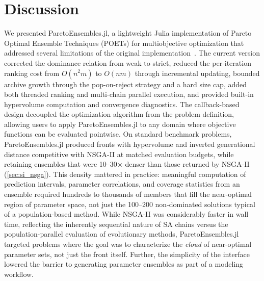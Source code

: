\documentclass[12pt]{article}
\begin{document}
\section{Discussion}\label{sec:discussion}
We presented ParetoEnsembles.jl, a lightweight Julia implementation of Pareto Optimal Ensemble Techniques (POETs) for multiobjective optimization that addressed several limitations of the original implementation~\cite{Song2010,Bassen2016}. The current version corrected the dominance relation from weak to strict, reduced the per-iteration ranking cost from $O(n^2 m)$ to $O(nm)$ through incremental updating, bounded archive growth through the pop-on-reject strategy and a hard size cap, added both threaded ranking and multi-chain parallel execution, and provided built-in hypervolume computation and convergence diagnostics. The callback-based design decoupled the optimization algorithm from the problem definition, allowing users to apply ParetoEnsembles.jl to any domain where objective functions can be evaluated pointwise. On standard benchmark problems, ParetoEnsembles.jl produced fronts with hypervolume and inverted generational distance competitive with NSGA-II at matched evaluation budgets, while retaining ensembles that were 10--30$\times$ denser than those returned by NSGA-II (\cref{sec:si_nsga}). This density mattered in practice: meaningful computation of prediction intervals, parameter correlations, and coverage statistics from an ensemble required hundreds to thousands of members that fill the near-optimal region of parameter space, not just the 100--200 non-dominated solutions typical of a population-based method. While NSGA-II was considerably faster in wall time, reflecting the inherently sequential nature of SA chains versus the population-parallel evaluation of evolutionary methods, ParetoEnsembles.jl targeted problems where the goal was to characterize the \emph{cloud} of near-optimal parameter sets, not just the front itself. Further, the simplicity of the interface lowered the barrier to generating parameter ensembles as part of a modeling workflow.
\end{document}
